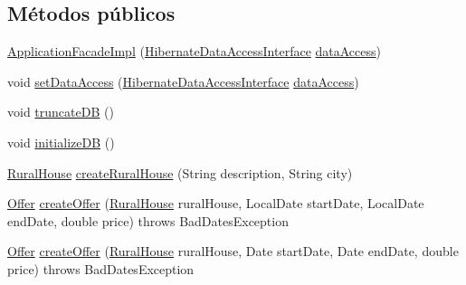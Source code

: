 \subsection*{Métodos públicos}
\begin{DoxyCompactItemize}
\item 
\mbox{\hyperlink{classcom_1_1ruralhousejsf_1_1business_logic_1_1_application_facade_impl_ad6ed360c754c5ba82a2b88bb4cf036f7}{Application\+Facade\+Impl}} (\mbox{\hyperlink{interfacecom_1_1ruralhousejsf_1_1data_access_1_1_hibernate_data_access_interface}{Hibernate\+Data\+Access\+Interface}} \mbox{\hyperlink{classcom_1_1ruralhousejsf_1_1business_logic_1_1_application_facade_impl_a96ac80fe606a4649e5fbbbd24935690a}{data\+Access}})
\item 
void \mbox{\hyperlink{classcom_1_1ruralhousejsf_1_1business_logic_1_1_application_facade_impl_a78fc6968b9fec7aa475b322463b6bd92}{set\+Data\+Access}} (\mbox{\hyperlink{interfacecom_1_1ruralhousejsf_1_1data_access_1_1_hibernate_data_access_interface}{Hibernate\+Data\+Access\+Interface}} \mbox{\hyperlink{classcom_1_1ruralhousejsf_1_1business_logic_1_1_application_facade_impl_a96ac80fe606a4649e5fbbbd24935690a}{data\+Access}})
\item 
void \mbox{\hyperlink{classcom_1_1ruralhousejsf_1_1business_logic_1_1_application_facade_impl_a5fe9f44c95b3459fb8999c26e5b934cb}{truncate\+DB}} ()
\item 
void \mbox{\hyperlink{classcom_1_1ruralhousejsf_1_1business_logic_1_1_application_facade_impl_a1e6cbb70c9568899c86135b3264b431d}{initialize\+DB}} ()
\item 
\mbox{\hyperlink{classcom_1_1ruralhousejsf_1_1domain_1_1_rural_house}{Rural\+House}} \mbox{\hyperlink{classcom_1_1ruralhousejsf_1_1business_logic_1_1_application_facade_impl_a48b82f812a30271878f50b99ae16a24b}{create\+Rural\+House}} (String description, String city)
\item 
\mbox{\hyperlink{classcom_1_1ruralhousejsf_1_1domain_1_1_offer}{Offer}} \mbox{\hyperlink{classcom_1_1ruralhousejsf_1_1business_logic_1_1_application_facade_impl_acbf81cc6dc4bf9adf9ea7a85751edfc0}{create\+Offer}} (\mbox{\hyperlink{classcom_1_1ruralhousejsf_1_1domain_1_1_rural_house}{Rural\+House}} rural\+House, Local\+Date start\+Date, Local\+Date end\+Date, double price)  throws Bad\+Dates\+Exception 
\item 
\mbox{\hyperlink{classcom_1_1ruralhousejsf_1_1domain_1_1_offer}{Offer}} \mbox{\hyperlink{classcom_1_1ruralhousejsf_1_1business_logic_1_1_application_facade_impl_a9aafb2ac6e91d643bc5dd1f5691d4075}{create\+Offer}} (\mbox{\hyperlink{classcom_1_1ruralhousejsf_1_1domain_1_1_rural_house}{Rural\+House}} rural\+House, Date start\+Date, Date end\+Date, double price)  throws Bad\+Dates\+Exception 

\end{DoxyCompactItemize}
